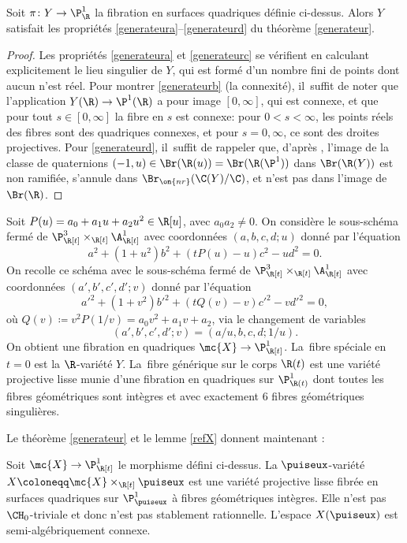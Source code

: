 \begin{lemma}\label{refX}
Soit $\pi \colon Y \to \P^1_{\R}$ la fibration en surfaces quadriques définie ci-dessus. Alors $Y$ satisfait les propriétés \eqref{generateura}--\eqref{generateurd} du théorème \ref{generateur}.
\end{lemma}
\begin{proof}
Les propriétés \eqref{generateura} et \eqref{generateurc} se vérifient en calculant explicitement le lieu singulier de $Y$, qui est formé d'un nombre fini de points dont aucun n'est réel. Pour montrer \eqref{generateurb} (la connexité), il~suffit de noter que l'application $Y(\R) \to \P^1(\R)$ a pour image $[0,\infty]$, qui est connexe, et que pour tout $s\in [0,\infty]$ la fibre en $s$ est connexe: pour $0<s<\infty$, les points réels des fibres sont des quadriques connexes, et pour $s=0,\infty$, ce sont des droites projectives. Pour \eqref{generateurd}, il~suffit de rappeler que, d'après \cite[Prop.\,13.1]{colliot2024certaines}, l'image de la classe de quaternions $(-1,u) \in \Br(\R(u))=\Br(\R(\P^1))$ dans $\Br(\R(Y))$ est non ramifiée, s'annule dans $\Br_{\on{nr}}(\C(Y)/\C)$, et n'est pas dans l'image de $\Br(\R)$.
\end{proof}

Soit $P(u)=a_0 + a_1u + a_2 u^2 \in \R[u]$, avec $a_0a_2\neq 0$.
On considère le sous-schéma fermé de $\P^3_{\R[t]} \times_{\R[t]} \A^1_{\R[t]}$ avec coordonnées $(a,b,c,d;u)$ donné par l'équation
\[a^2+(1+u^2)b^2 + (tP(u)- u)c^2 -ud^2=0.\]
On recolle ce schéma avec le sous-schéma fermé de $\P^3_{\R[t]} \times_{\R[t]} \A^1_{\R[t]}$ avec coordonnées $(a',b',c',d';v)$
donné par l'équation
\[a'^2+(1+v^2)b'^2 + (tQ(v)-v)c'^2 -vd'^2=0,\]
où $Q(v)\coloneqq v^2P(1/v)= a_0v^2 + a_1v + a_2$, via le changement de variables
\[(a',b',c',d';v)=(a/u, b, c, d; 1/u).\]
On obtient une fibration en quadriques $\mc{X} \to \P^1_{\R[t]}$. La~fibre spéciale en $t=0$ est la $\R$-variété $Y$. La~fibre générique sur le corps $\R(t)$
est une variété projective lisse munie d'une fibration en quadriques sur $\P^1_{\R(t)}$ dont toutes les fibres géométriques sont intègres et avec exactement $6$ fibres géométriques singulières.

Le théorème \ref{generateur} et le lemme \ref{refX} donnent maintenant :
\begin{thm}\label{prop-fibre-quadriques}
Soit $\mc{X}\to \P^1_{\R[t]}$ le morphisme défini ci-dessus.
La $\puiseux$-variété $X\coloneqq \mc{X}\times_{\R[t]} \puiseux$ est une variété projective lisse fibrée en surfaces quadriques sur $\P^1_{\puiseux}$ à fibres géométriques intègres. Elle n'est pas $\CH_0$-triviale et donc n'est pas stablement rationnelle. L'espace $X(\puiseux)$ est semi-algébriquement connexe.
\end{thm}

